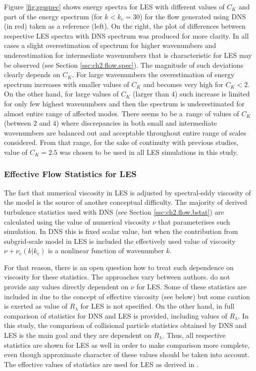 \documentclass{pracamgren}
\begin{document}
Figure \ref{fig:sgsspec} shows energy spectra for LES with different values of $C_K$ and part of the energy spectrum (for $k < k_c = 30$) for the flow generated using DNS (in red) taken as a reference (left).
On the right, the plot of differences between respective LES spectra with DNS spectrum was produced for more clarity.
In all cases a slight overestimation of spectrum for higher wavenumbers and underestimation for intermediate wavenumbers that is characteristic for LES may be observed (see Section \ref{ssc:ch2.flow.spec}).
The magnitude of such deviations clearly depends on $C_K$.
For large wavenumbers the overestimation of energy spectrum increases with smaller values of $C_K$ and becomes very high for $C_K < 2$.
On the other hand, for large values of $C_K$ (larger than $4$) such increase is limited for only few highest wavenumbers and then the spectrum is underestimated for almost entire range of affected modes.
There seems to be a~range of values of $C_K$ (between $2$ and $4$) where discrepancies in both small and intermediate wavenumbers are balanced out and acceptable throughout entire range of scales considered.
From that range, for the sake of continuity with previous studies, value of $C_K=2.5$ was chosen to be used in all LES simulations in this study.


\subsubsection{Effective Flow Statistics for LES}

The fact that numerical viscosity in LES is adjusted by spectral-eddy viscosity of the model is the source of another conceptual difficulty.
The majority of derived turbulence statistics used with DNS (see Section \ref{ssc:ch2.flow.bstat}) are calculated using the value of numerical viscosity $\nu$ that parameterises such simulation.
In DNS this is fixed scalar value, but when the contribution from subgrid-scale model in LES is included the effectively used value of viscosity $\nu + \nu_{e}(k|k_c)$ is a nonlinear function of wavenumber $k$.

For that reason, there is an open question how to treat such dependence on viscosity for these statistics.
The approaches vary between authors.
\textcite[Table 1 therein]{Yang2008} do not provide any values directly dependent on $\nu$ for LES.
Some of these statistics are included in \textcite[Table 1 therein]{Jin2010} due to the concept of effective viscosity (see below) but some caution is exerted as value of $R_{\lambda}$ for LES is not specified.
On the other hand, in \textcite[Table 1 therein]{Rosa2017} full comparison of statistics for DNS and LES is provided, including values of $R_{\lambda}$.
In this study, the comparison of collisional particle statistics obtained by DNS and LES is the main goal and they are dependent on $R_{\lambda}$.
Thus, all respective statistics are shown for LES as well in order to make comparison more complete, even though approximate character of these values should be taken into account.
The effective values of statistics are used for LES as derived in \textcite{Jin2010}.
\end{document}
